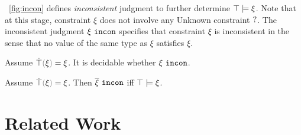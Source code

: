 \documentclass[runningheads,envcountsame,a4paper]{llncs}
\begin{document}
\figurename~\ref{fig:incon} defines \textit{inconsistent} judgment to further determine $\top \models \xi$. Note that at this stage, constraint $\xi$ does not involve any Unknown constraint $\mathtt{?}$. The inconsistent judgment $\xi ~\mathtt{incon}$ specifies that constraint $\xi$ is inconsistent in the sense that no value of the same type as $\xi$ satisfies $\xi$.



\begin{theorem}
  Assume $\ctruify{\xi}=\xi$. It is decidable whether $\xi ~\mathtt{incon}$.
\end{theorem}

\begin{theorem}
  Assume $\ctruify{\xi}=\xi$. Then $\overline{\xi} ~\mathtt{incon}$ iff $\top \models \xi$.
\end{theorem}

\section{Related Work}
\end{document}
